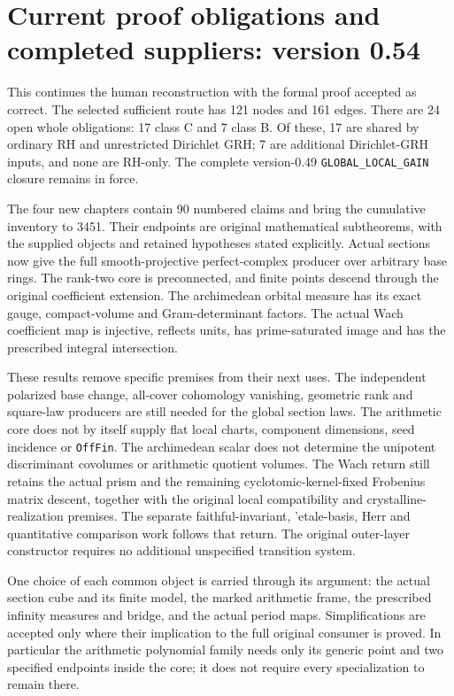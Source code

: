 \section{Current proof obligations and completed suppliers: version 0.54}
\label{sec:dependency-audit-v54}

This continues the human reconstruction with the formal proof accepted
as correct. The selected sufficient route has 121 nodes and 161 edges.
There are 24 open whole obligations: 17 class C and 7 class B.
Of these, 17 are shared by ordinary RH and unrestricted Dirichlet
GRH; 7 are additional Dirichlet-GRH inputs, and none are RH-only.
The complete version-0.49 \texttt{GLOBAL\_\allowbreak LOCAL\_\allowbreak GAIN} closure remains
in force.

The four new chapters contain 90 numbered claims and bring the
cumulative inventory to 3451. Their endpoints are original
mathematical subtheorems, with the supplied objects and retained
hypotheses stated explicitly. Actual sections now give the full
smooth-projective perfect-complex producer over arbitrary base rings.
The rank-two core is preconnected, and finite points descend through
the original coefficient extension. The archimedean orbital measure
has its exact gauge, compact-volume and Gram-determinant factors.
The actual Wach coefficient map is injective, reflects units, has
prime-saturated image and has the prescribed integral intersection.

These results remove specific premises from their next uses. The
independent polarized base change, all-cover cohomology vanishing,
geometric rank and square-law producers are still needed for the
global section laws. The arithmetic core does not by itself supply
flat local charts, component dimensions, seed incidence or
\texttt{Off\allowbreak Fin}. The archimedean scalar does not determine the
unipotent discriminant covolumes or arithmetic quotient volumes.
The Wach return still retains the actual prism and the remaining
cyclotomic-kernel-fixed Frobenius matrix descent, together with the
original local compatibility and crystalline-realization premises.
The separate faithful-invariant, 'etale-basis, Herr and quantitative
comparison work follows that return. The original outer-layer
constructor requires no additional unspecified transition system.

One choice of each common object is carried through its argument:
the actual section cube and its finite model, the marked arithmetic
frame, the prescribed infinity measures and bridge, and the actual
period maps. Simplifications are accepted only where their implication
to the full original consumer is proved. In particular the arithmetic
polynomial family needs only its generic point and two specified
endpoints inside the core; it does not require every specialization
to remain there.

